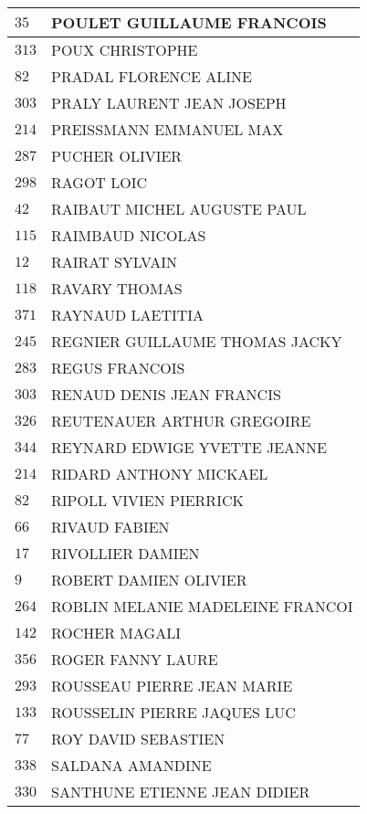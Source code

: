 \begin{xltabular}{\linewidth}{|l|X|}
    \hline
    $35$ & POULET GUILLAUME FRANCOIS \\
    \hline
    $313$ & POUX CHRISTOPHE \\
    \hline
    $82$ & PRADAL FLORENCE ALINE \\
    \hline
    $303$ & PRALY LAURENT JEAN JOSEPH \\
    \hline
    $214$ & PREISSMANN EMMANUEL MAX \\
    \hline
    $287$ & PUCHER OLIVIER \\
    \hline
    $298$ & RAGOT LOIC \\
    \hline
    $42$ & RAIBAUT MICHEL AUGUSTE PAUL \\
    \hline
    $115$ & RAIMBAUD NICOLAS \\
    \hline
    $12$ & RAIRAT SYLVAIN \\
    \hline
    $118$ & RAVARY THOMAS \\
    \hline
    $371$ & RAYNAUD LAETITIA \\
    \hline
    $245$ & REGNIER GUILLAUME THOMAS JACKY \\
    \hline
    $283$ & REGUS FRANCOIS \\
    \hline
    $303$ & RENAUD DENIS JEAN FRANCIS \\
    \hline
    $326$ & REUTENAUER ARTHUR GREGOIRE \\
    \hline
    $344$ & REYNARD EDWIGE YVETTE JEANNE \\
    \hline
    $214$ & RIDARD ANTHONY MICKAEL \\
    \hline
    $82$ & RIPOLL VIVIEN PIERRICK \\
    \hline
    $66$ & RIVAUD FABIEN \\
    \hline
    $17$ & RIVOLLIER DAMIEN \\
    \hline
    $9$ & ROBERT DAMIEN OLIVIER \\
    \hline
    $264$ & ROBLIN MELANIE MADELEINE FRANCOI \\
    \hline
    $142$ & ROCHER MAGALI \\
    \hline
    $356$ & ROGER FANNY LAURE \\
    \hline
    $293$ & ROUSSEAU PIERRE JEAN MARIE \\
    \hline
    $133$ & ROUSSELIN PIERRE JAQUES LUC \\
    \hline
    $77$ & ROY DAVID SEBASTIEN \\
    \hline
    $338$ & SALDANA AMANDINE \\
    \hline
    $330$ & SANTHUNE ETIENNE JEAN DIDIER \\

\end{xltabular}
